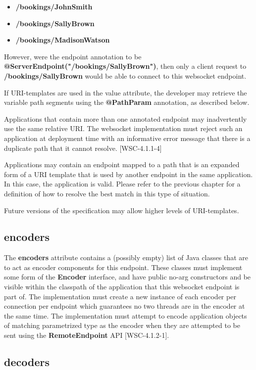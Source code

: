 \begin{itemize}
\item \textbf{/bookings/JohnSmith}
\item \textbf{/bookings/SallyBrown}
\item \textbf{/bookings/MadisonWatson}
\end{itemize}

However, were the endpoint annotation to be \textbf{@ServerEndpoint("/bookings/SallyBrown")}, then only a client request to \textbf{/bookings/SallyBrown} would be able to connect to this websocket endpoint.

If URI-templates are used in the value attribute, the developer may retrieve the variable path segments using the \textbf{@PathParam} annotation, as described below.

Applications that contain more than one annotated endpoint may inadvertently use the same relative URI. The websocket implementation must reject such an application at deployment time with an informative error message that there is a duplicate path that it cannot resolve. [WSC-4.1.1-4]

Applications may contain an endpoint mapped to a path that is an expanded form of a URI template that is used by another endpoint in the same application. In this case, the application is valid. Please refer to the previous chapter for a definition of how to resolve the best match in this type of situation.

Future versions of the specification may allow higher levels of URI-templates.

\subsection{encoders}

The \textbf{encoders} attribute contains a (possibly empty) list of Java classes that are to act as encoder components for this endpoint. These classes must implement some form of the \textbf{Encoder} interface, and have public no-arg constructors and be visible within the classpath of the application that this websocket endpoint is part of. The implementation must create a new instance of each encoder per connection per endpoint which guarantees no two threads are in the encoder at the same time. The implementation must attempt to encode application objects of matching parametrized type as the encoder when they are attempted to be sent using the \textbf{RemoteEndpoint} API [WSC-4.1.2-1].

\subsection{decoders}


